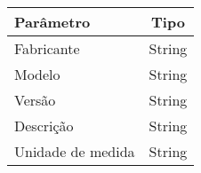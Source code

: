 \begin{tabular}{lc}
  \toprule
  Parâmetro              & Tipo   \\
  \midrule
  Fabricante             & String \\
  Modelo                 & String \\
  Versão                 & String \\
  Descrição              & String \\
  Unidade de medida      & String \\
  \bottomrule
\end{tabular}
